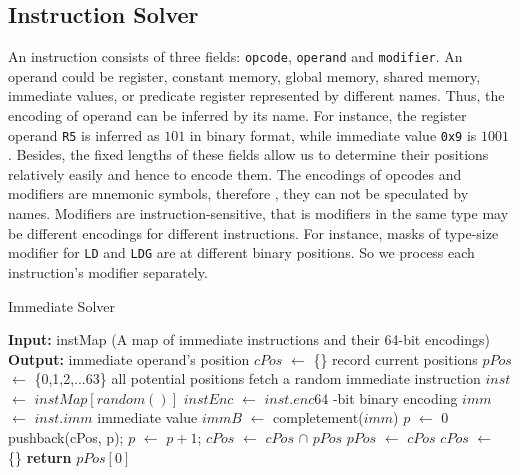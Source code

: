 \subsection{Instruction Solver}


An instruction consists of three fields: {\tt opcode}, {\tt operand} and {\tt modifier}. An operand could be register, 
constant memory, global memory, shared memory, immediate values, or predicate register represented by different names.
Thus, the encoding of operand can be inferred by its name. For instance, the register operand {\tt R5} is
inferred as $101$ in binary format, while immediate value {\tt 0x9} is $1001$. 
Besides, the fixed lengths of these fields allow us to determine their positions  relatively easily and hence to encode them. 
The encodings of opcodes and modifiers are mnemonic symbols, therefore
, they can not be speculated by names. 
Modifiers are instruction-sensitive, that is modifiers in the same type may be different encodings for different instructions. 
For instance, masks of type-size
modifier for {\tt LD} and {\tt LDG} are at different binary positions. So we process each instruction's modifier separately. 


\begin{algorithm}
      \caption{Immediate Solver}
      \label{algo:int_solver}
  \begin{algorithmic}[1]
	  \State \textbf{Input:} instMap (A map of immediate instructions and their 64-bit encodings)
      \State \textbf{Output:} immediate operand's position
      \State $cPos$ $\gets$ \{\} \Comment record current positions
      \State $pPos$ $\gets$ \{0,1,2,...63\} \Comment all potential positions
      \Comment fetch a random immediate instruction
      \State $inst$ $\gets$ $instMap[random()]$ 
      \State $instEnc$ $\gets$ $inst.enc64$ -bit binary encoding
      \State $imm$ $\gets$ $inst.imm$ \Comment immediate value
      \State $immB$ $\gets$ completement($imm$)
      \State $p$ $\gets$ 0
      \State pushback(cPos, p); $p$ $\gets$ $p+1$;
      \EndIf
      \EndWhile
      \State $cPos$ $\gets$ $cPos$ $\cap$ $pPos$
      \State $pPos$ $\gets$ $cPos$
      \State $cPos$ $\gets$ \{\}
      \EndWhile
      \State \textbf{return} $pPos[0]$
  \end{algorithmic}
\end{algorithm}


